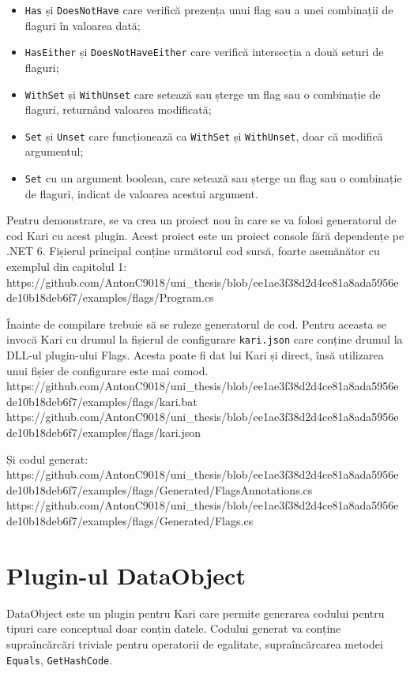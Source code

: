 \documentclass[a4paper,12pt]{report}
\begin{document}
\begin{itemize}
  \item \texttt{Has} și \texttt{DoesNotHave} care verifică prezența unui flag sau a unei combinații de flaguri în valoarea dată;
  \item \texttt{HasEither} și \texttt{DoesNotHaveEither} care verifică intersecția a două seturi de flaguri;
  \item \texttt{WithSet} și \texttt{WithUnset} care setează sau șterge un flag sau o combinație de flaguri, returnând valoarea modificată;
  \item \texttt{Set} și \texttt{Unset} care funcționează ca \texttt{WithSet} și \texttt{WithUnset}, doar că modifică argumentul;
  \item \texttt{Set} cu un argument boolean, care setează sau șterge un flag sau o combinație de flaguri, indicat de valoarea acestui argument.
\end{itemize}

Pentru demonstrare, se va crea un proiect nou în care se va folosi generatorul de cod Kari cu acest plugin.
Acest proiect este un proiect console fără dependențe pe .NET 6.
Fișierul principal conține următorul cod sursă, foarte asemănător cu exemplul din capitolul 1:
https://github.com/AntonC9018/uni_thesis/blob/ee1ae3f38d2d4ce81a8ada5956ede10b18deb6f7/examples/flags/Program.cs


Înainte de compilare trebuie să se ruleze generatorul de cod.
Pentru aceasta se invocă Kari cu drumul la fișierul de configurare \texttt{kari.json} care conține drumul la \ac{DLL}-ul plugin-ului Flags.
Acesta poate fi dat lui Kari și direct, însă utilizarea unui fișier de configurare este mai comod.
https://github.com/AntonC9018/uni_thesis/blob/ee1ae3f38d2d4ce81a8ada5956ede10b18deb6f7/examples/flags/kari.bat
https://github.com/AntonC9018/uni_thesis/blob/ee1ae3f38d2d4ce81a8ada5956ede10b18deb6f7/examples/flags/kari.json


Și codul generat:
https://github.com/AntonC9018/uni_thesis/blob/ee1ae3f38d2d4ce81a8ada5956ede10b18deb6f7/examples/flags/Generated/FlagsAnnotations.cs
https://github.com/AntonC9018/uni_thesis/blob/ee1ae3f38d2d4ce81a8ada5956ede10b18deb6f7/examples/flags/Generated/Flags.cs

\section{Plugin-ul DataObject}

DataObject este un plugin pentru Kari care permite generarea codului pentru tipuri care conceptual doar conțin datele.
Codului generat va conține supraîncărcări triviale pentru operatorii de egalitate, supraîncărcarea metodei \texttt{Equals}, \texttt{GetHashCode}.
\end{document}

